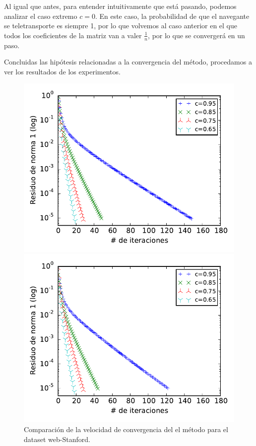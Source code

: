 Al igual que antes, para entender intuitivamente que está pasando, podemos analizar el caso extremo $c = 0$. En este caso, la probabilidad de que el navegante se teletransporte es siempre 1, por lo que volvemos al caso anterior en el que todos los coeficientes de la matriz van a valer $\frac1n$, por lo que se convergerá en un paso.

Concluidas las hipótesis relacionadas a la convergencia del método, procedamos a ver los resultados de los experimentos.


\begin{figure}[H]
\centering
\begin{minipage}{0.48\textwidth}
  \centering
    \includegraphics[width=1\textwidth]{imgs/convergencia-stanford.pdf}
  \caption{\footnotesize{Comparación de la velocidad de convergencia del el método para el dataset web-Stanford.}}
  \label{fig:conv1}
\end{minipage}
\hspace{0.02\textwidth}
\begin{minipage}{0.48\textwidth}
  \centering
    \includegraphics[width=1\textwidth]{imgs/convergencia-notredame.pdf}

\end{minipage}
\end{figure}
